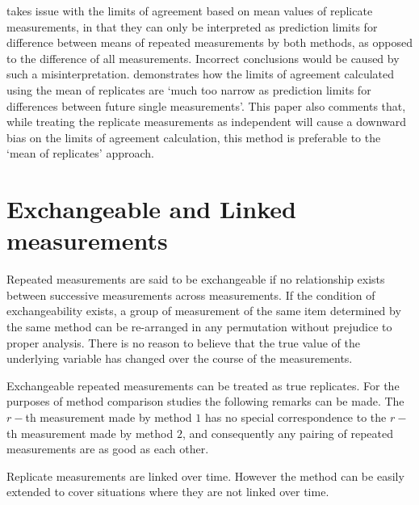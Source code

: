 \documentclass[12pt, a4paper]{report}
\theoremstyle{plain}
\theoremstyle{definition}
\theoremstyle{remark}
\begin{document}
	\citet{BXC2008} takes issue with the limits of agreement based on
	mean values of replicate measurements, in that they can only be interpreted as prediction
	limits for difference between means of repeated measurements by
	both methods, as opposed to the difference of all measurements.
	Incorrect conclusions would be caused by such a misinterpretation.
	\citet{BXC2008} demonstrates how the limits of agreement
	calculated using the mean of replicates are `much too narrow as
	prediction limits for differences between future single
	measurements'. This paper also comments that, while treating the
	replicate measurements as independent will cause a downward bias
	on the limits of agreement calculation, this method is preferable
	to the `mean of replicates' approach.
	
	
	
	
	
	
	
	

	\section{Exchangeable and Linked measurements}
	
	
	Repeated measurements are said to be exchangeable if no relationship exists between successive measurements across measurements. If the condition of exchangeability exists, a group of measurement of the same item determined by the same method can be re-arranged in any permutation without prejudice to proper analysis. There is no reason to believe that the true value of the underlying variable has changed over the course of the measurements.
	
	Exchangeable repeated measurements can be treated as true replicates. For the purposes of method comparison studies the following remarks can be made. The $r-$th measurement made by method $1$ has no special correspondence to the $r-$th measurement made by method $2$, and consequently any pairing of repeated measurements are as good as each other.
	
	
	
	
	Replicate measurements are linked over time. However the method can be easily extended to cover situations where they are not linked over time.
	
\end{document}
